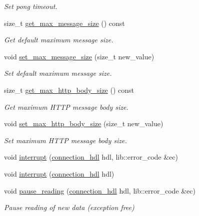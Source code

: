\begin{DoxyCompactItemize}
\begin{DoxyCompactList}\small\item\em Set pong timeout. \end{DoxyCompactList}\item 
size\+\_\+t \hyperlink{classwebsocketpp_1_1endpoint_add48746fa48a371eed808dd743140c08}{get\+\_\+max\+\_\+message\+\_\+size} () const 
\begin{DoxyCompactList}\small\item\em Get default maximum message size. \end{DoxyCompactList}\item 
void \hyperlink{classwebsocketpp_1_1endpoint_a6268a63c9ce030941fcfb32ddabf3090}{set\+\_\+max\+\_\+message\+\_\+size} (size\+\_\+t new\+\_\+value)
\begin{DoxyCompactList}\small\item\em Set default maximum message size. \end{DoxyCompactList}\item 
size\+\_\+t \hyperlink{classwebsocketpp_1_1endpoint_ae554bc4e2d2ef9be25165c223effd818}{get\+\_\+max\+\_\+http\+\_\+body\+\_\+size} () const 
\begin{DoxyCompactList}\small\item\em Get maximum H\+T\+T\+P message body size. \end{DoxyCompactList}\item 
void \hyperlink{classwebsocketpp_1_1endpoint_a00be7e08ca5c567dd2a4989b8d41d26b}{set\+\_\+max\+\_\+http\+\_\+body\+\_\+size} (size\+\_\+t new\+\_\+value)
\begin{DoxyCompactList}\small\item\em Set maximum H\+T\+T\+P message body size. \end{DoxyCompactList}\item 
void \hyperlink{classwebsocketpp_1_1endpoint_ab6cd8d850c40f33f48d0afb4d7be094c}{interrupt} (\hyperlink{namespacewebsocketpp_a6b3d26a10ee7229b84b776786332631d}{connection\+\_\+hdl} hdl, lib\+::error\+\_\+code \&ec)
\item 
void \hyperlink{classwebsocketpp_1_1endpoint_aa77facb47f09c143e5c22486f02bb455}{interrupt} (\hyperlink{namespacewebsocketpp_a6b3d26a10ee7229b84b776786332631d}{connection\+\_\+hdl} hdl)
\item 
void \hyperlink{classwebsocketpp_1_1endpoint_aef7666b82bf98864b213c3df09298595}{pause\+\_\+reading} (\hyperlink{namespacewebsocketpp_a6b3d26a10ee7229b84b776786332631d}{connection\+\_\+hdl} hdl, lib\+::error\+\_\+code \&ec)
\begin{DoxyCompactList}\small\item\em Pause reading of new data (exception free) \end{DoxyCompactList}\item 

\end{DoxyCompactItemize}
